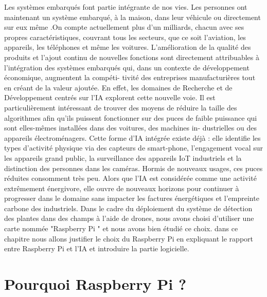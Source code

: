 Les systèmes embarqués font partie intégrante de nos vies. Les personnes ont maintenant un système embarqué, à la maison, dans leur véhicule ou directement sur eux même .On compte actuellement plus d'un milliards, chacun avec ses propres caractéristiques, couvrant tous les secteurs,
que ce soit l'aviation, les appareils, les téléphones et même les voitures. L'amélioration de la qualité
des produits et l'ajout continu de nouvelles fonctions sont directement attribuables à l'intégration des
systèmes embarqués qui, dans un contexte de développement économique, augmentent la compéti-
tivité des entreprises manufacturières tout en créant de la valeur ajoutée. En effet, les domaines de
Recherche et de Développement centrés sur l'IA explorent cette nouvelle voie. Il est particulièrement
intéressant de trouver des moyens de réduire la taille des algorithmes afin qu'ils puissent fonctionner
sur des puces de faible puissance qui sont elles-mêmes installées dans des voitures, des machines in-
dustrielles ou des appareils électroménagers. Cette forme d'IA intégrée existe déjà : elle identifie les
types d'activité physique via des capteurs de smart-phone, l'engagement vocal sur les appareils grand
public, la surveillance des appareils IoT industriels et la distinction des personnes dans les caméras.
Hormis de nouveaux usages, ces puces réduites consomment très peu. Alors que l'IA est considérée
comme une activité extrêmement énergivore, elle ouvre de nouveaux horizons pour continuer à progresser dans le domaine sans impacter les factures énergétiques et l'empreinte carbone des industriels.
\newline
Dans le cadre du déploiement du système de détection des plantes dans des champs à l'aide de drones,
nous avons choisi d'utiliser une carte nommée "Raspberry Pi " et nous avons bien étudié ce choix.
\newline
dans ce chapitre nous allons justifier le choix du Raspberry Pi en expliquant le rapport entre Raspberry Pi et l'IA et introduire la partie logicielle.
\section{Pourquoi  Raspberry Pi ? }

